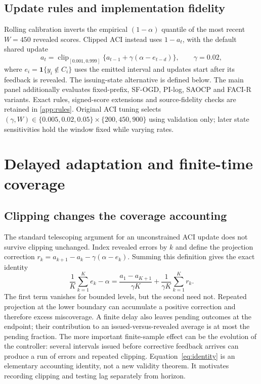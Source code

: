 \documentclass[preprint,11pt]{elsarticle}
\newcommand{\ind}{\mathbf{1}}
\newcommand{\clip}{\operatorname{clip}}
\begin{document}
\subsection{Update rules and implementation fidelity}
Rolling calibration inverts the empirical $(1-\alpha)$ quantile of the most recent
$W=450$ revealed scores. Clipped ACI instead uses $1-a_t$, with the default shared update
\begin{equation}\label{eq:aci}
a_t=\clip_{[0.001,0.999]}\{a_{t-1}+\gamma(\alpha-e_{t-d})\},\qquad\gamma=0.02,
\end{equation}
where $e_i=\ind\{y_i\notin C_i\}$ uses the emitted interval and updates start after
its feedback is revealed. The issuing-state alternative is defined below.
The main panel additionally evaluates fixed-prefix, SF-OGD, PI-log, SAOCP and FACI-R
variants. Exact rules, signed-score extensions and source-fidelity checks are retained
in \ref{app:rules}. Original ACI tuning selects
$(\gamma,W)\in\{0.005,0.02,0.05\}\times\{200,450,900\}$ using validation only;
later state sensitivities hold the window fixed while varying rates.

\section{Delayed adaptation and finite-time coverage}
\subsection{Clipping changes the coverage accounting}
The standard telescoping argument for an unconstrained ACI update does not survive
clipping unchanged. Index revealed errors by $k$ and define the projection correction
$r_k=a_{k+1}-a_k-\gamma(\alpha-e_k)$. Summing this definition gives the exact identity
\begin{equation}\label{eq:identity}
 \frac{1}{K}\sum_{k=1}^K e_k-\alpha
 =\frac{a_1-a_{K+1}}{\gamma K}+\frac{1}{\gamma K}\sum_{k=1}^K r_k.
\end{equation}
The first term vanishes for bounded levels, but the second need not. Repeated projection
at the lower boundary can accumulate a positive correction and therefore excess
miscoverage. A finite delay also leaves pending outcomes at the endpoint; their contribution
to an issued-versus-revealed average is at most the pending fraction. The more important
finite-sample effect can be the evolution of the controller: several intervals issued
before corrective feedback arrives can produce a run of errors and repeated clipping.
Equation~\eqref{eq:identity} is an elementary accounting identity, not a new validity theorem.
It motivates recording clipping and testing lag separately from horizon.
\end{document}
